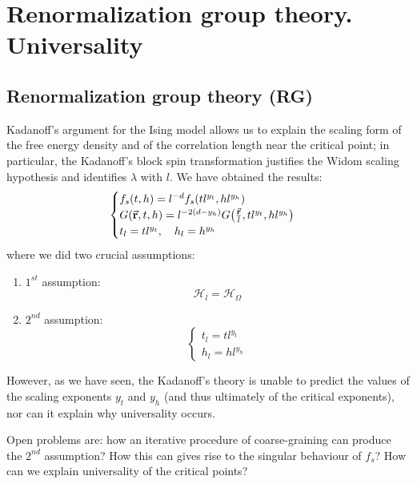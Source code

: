 \documentclass[../../Main/Main.tex]{subfiles}
\begin{document}
\chapter{Renormalization group theory. Universality}

\section{Renormalization group theory (RG)}

Kadanoff's argument for the Ising model allows us to explain the scaling form of the free energy density and of the correlation length near the critical point; in particular, the Kadanoff's block spin transformation justifies the Widom scaling hypothesis and identifies \( \lambda  \) with \( l \). We have obtained the results:
\begin{equation*}
  \begin{cases}
   f_s (t,h) = l^{-d} f_s \qty(t l^{y_t}, h l^{y_h}) \\
   G (\va{r},t,h) = l^{-2(d-y_h)} G \qty(\frac{\va{r}}{l}, t l^{y_t}, h l^{y_h}) \\
   t_l = t l ^{y_t}, \quad h_l = h^{y_h}
  \end{cases}
\end{equation*}
where we did two crucial assumptions:
\begin{enumerate}
\item \( 1^{st} \) assumption:
 \begin{equation*}
  \mathcal{H}_l = \mathcal{H}_\Omega
\end{equation*}
\item \( 2^{nd} \) assumption:
\begin{equation*}
  \begin{cases}
   t_l = t l^{y_t}\\
   h_l = h l^{y_h}
  \end{cases}
\end{equation*}
\end{enumerate}
 \noindent However, as we have seen, the Kadanoff's theory is unable to predict the values of the scaling exponents \( y_t \) and \( y_h \)  (and thus ultimately of the critical exponents), nor can it explain why universality occurs.

 \begin{remark}
 Open problems are: how an iterative procedure of coarse-graining can produce the \( 2^{nd} \) assumption? How this can gives rise to the singular behaviour of \( f_s \)? How can we explain universality of the critical points?
 \end{remark}
\end{document}
